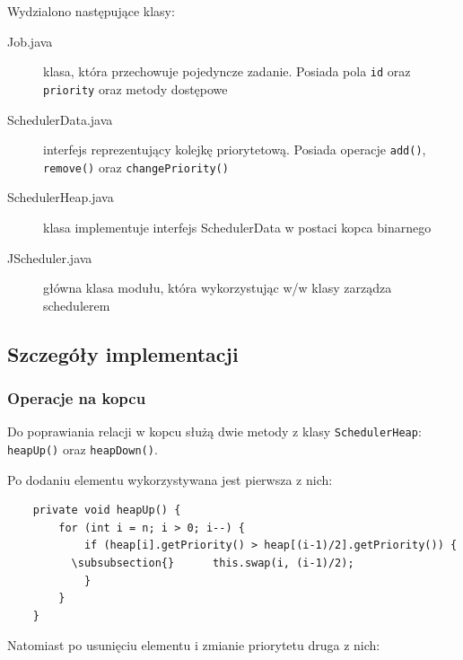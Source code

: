 \documentclass[12pt,a4paper]{article}
\begin{document}
Wydzialono następujące klasy:

\begin{description}
	\item [Job.java] klasa, która przechowuje pojedyncze zadanie. Posiada pola \texttt{id} oraz \texttt{priority} oraz metody dostępowe
	\item [SchedulerData.java] interfejs reprezentujący kolejkę priorytetową. Posiada operacje \texttt{add()}, \texttt{remove()} oraz \texttt{changePriority()}
	\item [SchedulerHeap.java] klasa implementuje interfejs SchedulerData w postaci kopca binarnego
	\item [JScheduler.java] główna klasa modułu, która wykorzystując w/w klasy zarządza schedulerem
\end{description}

\subsection{Szczegóły implementacji}

\subsubsection{Operacje na kopcu}

Do poprawiania relacji w kopcu służą dwie metody z klasy \texttt{SchedulerHeap}: \texttt{heapUp()} oraz \texttt{heapDown()}.

Po dodaniu elementu wykorzystywana jest pierwsza z nich:

\begin{lstlisting}
    private void heapUp() {
        for (int i = n; i > 0; i--) {
            if (heap[i].getPriority() > heap[(i-1)/2].getPriority()) {
          \subsubsection{}      this.swap(i, (i-1)/2);
            }
        }
    }
\end{lstlisting}

Natomiast po usunięciu elementu i zmianie priorytetu druga z nich:
\end{document}
